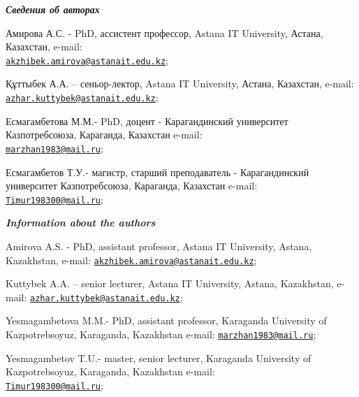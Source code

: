 \begin{authorinfo}
\emph{{\bfseries Сведения об авторах}}

Амирова А.С. - PhD, ассистент профессор, Astana IT University, Астана,
Казахстан, e-mail:\\
\href{mailto:akzhibek.amirova@astanait.edu.kz}{\nolinkurl{akzhibek.amirova@astanait.edu.kz}};

Құттыбек А.А. -- сеньор-лектор, Astana IT University, Астана, Казахстан,
e-mail:
\href{mailto:azhar.kuttybek@astanait.edu.kz}{\nolinkurl{azhar.kuttybek@astanait.edu.kz}};

Есмагамбетова М.М.- PhD, доцент - Карагандинский университет
Казпотребсоюза, Караганда, Казахстан e-mail:\\
\href{mailto:marzhan1983@mail.ru}{\nolinkurl{marzhan1983@mail.ru}};

Есмагамбетов Т.У.- магистр, старший преподаватель - Карагандинский
университет Казпотребсоюза, Караганда, Казахстан e-mail:
\href{mailto:Timur198300@mail.ru}{\nolinkurl{Timur198300@mail.ru}};

\emph{{\bfseries Information about the authors}}

Amirova A.S. - PhD, assistant professor, Astana IT University, Astana,
Kazakhstan, e-mail:
\href{mailto:akzhibek.amirova@astanait.edu.kz}{\nolinkurl{akzhibek.amirova@astanait.edu.kz}};

Kuttybek A.A. -- senior lecturer, Astana IT University, Astana,
Kazakhstan, e-mail:
\href{mailto:azhar.kuttybek@astanait.edu.kz}{\nolinkurl{azhar.kuttybek@astanait.edu.kz}};

Yesmagambetova M.M.- PhD, assistant professor, Karaganda University of
Kazpotrebsoyuz, Karaganda, Kazakhstan e-mail:
\href{mailto:marzhan1983@mail.ru}{\nolinkurl{marzhan1983@mail.ru}};

Yesmagambetov T.U.- master, senior lecturer, Karaganda University of
Kazpotrebsoyuz, Karaganda, Kazakhstan e-mail:\\
\href{mailto:Timur198300@mail.ru}{\nolinkurl{Timur198300@mail.ru}};
\end{authorinfo}
